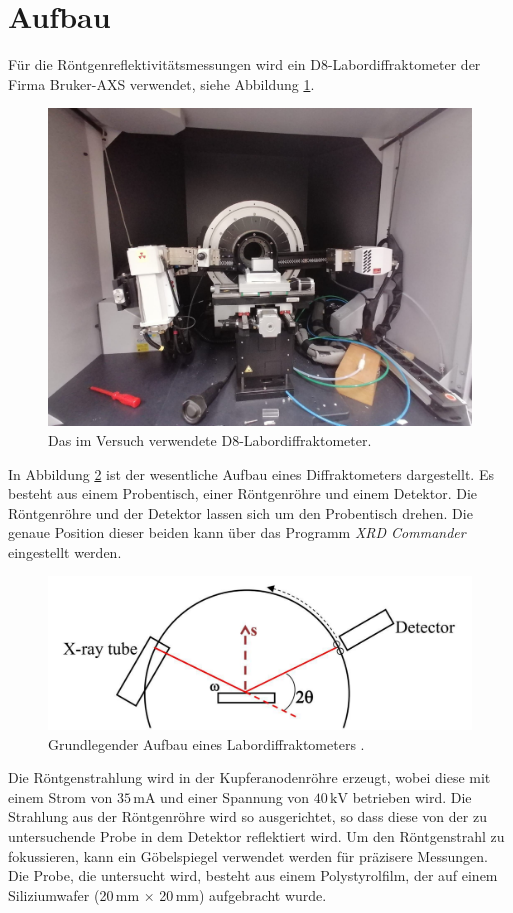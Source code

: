 \section{Aufbau}
Für die Röntgenreflektivitätsmessungen wird ein D8-Labordiffraktometer der Firma 
Bruker-AXS verwendet, siehe Abbildung \ref{fig:Versuchsaufbau}. 
\begin{figure}[H]
    \centering
    \includegraphics[scale=0.3]{Versuchsaufbau.pdf}
    \caption{Das im Versuch verwendete D8-Labordiffraktometer.}
    \label{fig:Versuchsaufbau}
  \end{figure}
\noindent
In Abbildung \ref{fig:diffraktometer} ist der wesentliche Aufbau 
eines Diffraktometers dargestellt. Es besteht aus einem Probentisch, einer Röntgenröhre
und einem Detektor. Die Röntgenröhre und der Detektor lassen sich um den 
Probentisch drehen. Die genaue Position dieser beiden
kann über das Programm \textit{XRD Commander} eingestellt werden. 
\begin{figure}[H]
  \centering
  \includegraphics[scale=0.3]{diffraktometer.pdf}
  \caption{Grundlegender Aufbau eines Labordiffraktometers \cite{MIT}.}
  \label{fig:diffraktometer}
\end{figure}
\noindent
Die Röntgenstrahlung wird in der Kupferanodenröhre erzeugt, wobei diese mit einem Strom 
von $35\,\unit{\milli\ampere}$ und einer Spannung von $40\,\unit{\kilo\volt}$ betrieben wird.
Die Strahlung aus der Röntgenröhre wird so ausgerichtet, so dass diese von der zu untersuchende Probe 
in dem Detektor reflektiert wird. Um den Röntgenstrahl zu fokussieren, kann ein Göbelspiegel verwendet werden für präzisere Messungen.
Die Probe, die untersucht wird, besteht aus einem Polystyrolfilm, der auf einem Siliziumwafer (20\,mm × 20\,mm) aufgebracht wurde.


